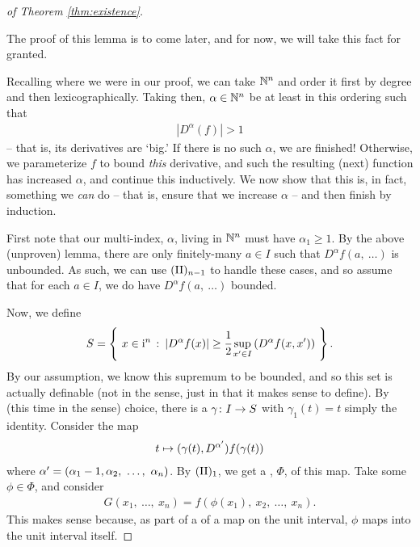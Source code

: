 \begin{proof}[of Theorem \ref{thm:existence}]
\begin{lemma}
      \label{lem:fin_a_unbounded}
    \end{lemma}

    The proof of this lemma is to come later, and for now, we will take this fact for granted.

    Recalling where we were in our proof, we can take $\N^n$ and order it first by degree and then lexicographically. Taking then, $\alpha \in \N^n$ be at least in this ordering such that
      \begin{align*}
        \left\vert D^{\alpha}(f) \right\vert > 1
      \end{align*}
    -- that is, its derivatives are `big.' If there is no such $\alpha$, we are finished! Otherwise, we parameterize $f$ to bound \emph{this} derivative, and such the resulting (next) function has increased $\alpha$, and continue this inductively. We now show that this is, in fact, something we \emph{can} do -- that is, ensure that we increase $\alpha$ -- and then finish by induction.

    First note that our multi-index, $\alpha$, living in $\N^n$ must have $\alpha_1 \geq 1$. By the above (unproven) lemma, there are only finitely-many $a \in I$ such that $D^{\alpha} f(a, \ \hdots)$ is unbounded. As such, we can use $\IIn[n-1]$ to handle these cases, and so assume that for each $a \in I$, we do have $D^{\alpha} f(a, \ \hdots)$ bounded.

    Now, we define
      \begin{align*}
        S = \left\{ \ x \in \I^n \ \colon \left\vert D^{\alpha} f(x) \right\vert \geq \cfrac{1}{2} \sup_{\pri{x} \in I} \left( D^{\alpha} f(x, \pri{x}) \right) \ \right\}.
      \end{align*}
    By our assumption, we know this supremum to be bounded, and so this set is actually definable (not in the \om sense, just in that it makes sense to define). By  (this time in the \om sense) choice, there is a  $\funcdom{\gamma}{I}{S}$ with $\gamma_1(t) = t$ simply the identity. Consider the map
      \begin{align*}
        t \mapsto (\gamma(t), D^{\pri{\alpha}}) f (\gamma(t))
      \end{align*}
    where $\pri{\alpha} = (\alpha_1 - 1, \alpha_2, \ \hdots, \ \alpha_n)$. By $\IIn[1]$, we get a \cellrparam, $\Phi$, of this map. Take some $\phi \in \Phi$, and consider
      \begin{align*}
        G(x_1, \ \hdots, \ x_n) = f(\phi(x_1), \ x_2, \ \hdots, \ x_n ).
      \end{align*}
    This makes sense because, as part of a \cellrparam of a map on the unit interval, $\phi$ maps into the unit interval itself.


\end{proof}
